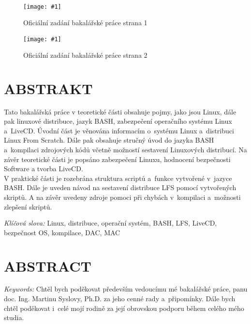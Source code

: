 \documentclass[a4paper,12pt]{article}
\newcommand{\nm}[1]{\clearpage\section*{\uppercase{#1}}}	%
\newcommand{\nns}[1]{\section*{\uppercase{#1}}}		%
\newcommand{\obr}[3]{%
	\begin{figure}[h]
	\center\texttt{[image: \#1]}
	\caption{#3}
	\end{figure}
	}
\newcommand{\ofZadani}[2]{%
	\begin{figure}[h]
	\center\texttt{[image: \#1]}
	\caption{#2}
	\end{figure}
	}
\begin{document}
\clearpage
\thispagestyle{empty}
\ofZadani{./img/ofZadani/ofZadaniStr1.png}{Oficiální zadání bakalářské práce strana 1}
\clearpage
\thispagestyle{empty}
\ofZadani{./img/ofZadani/ofZadaniStr2.png}{Oficiální zadání bakalářské práce strana 2}
\clearpage
\thispagestyle{empty}
\voffset=-1.61cm\evensidemargin=0.96cm\oddsidemargin=0.96cm\headsep=1cm\headheight=0.5cm\setlength{\parskip}{3pt}\textheight=248mm\textwidth=155mm
\nm{\uppercase{Abstrakt}}
\vspace{1cm}
Tato bakalářská práce v teoretické části obsahuje pojmy, jako jsou Linux, dále pak linuxové distribuce, jazyk BASH, zabezpečení operačního systému Linux a~LiveCD. Úvodní část je věnována informacím o~systému Linux a~distribuci Linux From Scratch. Dále pak obsahuje stručný úvod do jazyka BASH a~kompilaci zdrojových kódů včetně možností sestavení Linuxových distribucí. Na závěr teoretické části je popsáno zabezpečení Linuxu, hodnocení bezpečnosti Software a tvorba LiveCD.\\

V praktické části je rozebrána struktura scriptů a~funkce vytvořené v~jazyce BASH. Dále je uveden návod na sestavení distribuce LFS pomocí vytvořených skriptů. A na závěr uvedeny zdroje pomoci při chybách v~kompilaci a~možnosti zlepšení skriptů.
\vspace{1cm}

\emph{Klíčová slova:} Linux, distribuce, operační systém, BASH, LFS, LiveCD, bezpečnost OS, kompilace, DAC, MAC

\vspace{3cm}

\nns{\uppercase{Abstract}}

\vspace{1cm}

\emph{Keywords:}
\clearpage
\thispagestyle{empty}
Chtěl bych poděkovat především vedoucímu mé bakalářské práce, panu doc. Ing. Martinu Syslovy, Ph.D. za jeho cenné rady a~připomínky.
Dále bych chtěl poděkovat i~celé mojí rodině za její obrovskou podporu během celého mého studia.
\end{document}
